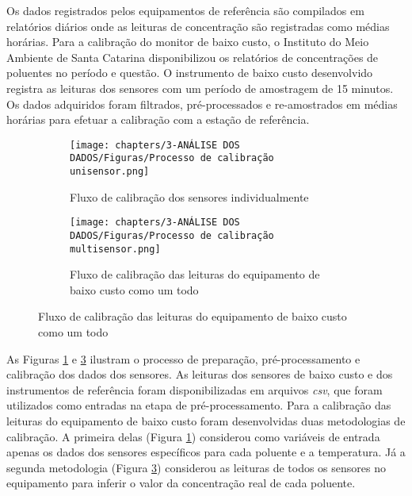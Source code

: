 Os dados registrados pelos equipamentos de referência são compilados em relatórios diários onde as leituras de concentração são registradas como médias horárias. Para a calibração do monitor de baixo custo, o Instituto do Meio Ambiente de Santa Catarina disponibilizou os relatórios de concentrações de poluentes no período e questão. O instrumento de baixo custo desenvolvido registra as leituras dos sensores com um período de amostragem de 15 minutos. Os dados adquiridos foram filtrados, pré-processados e re-amostrados em médias horárias para efetuar a calibração com a estação de referência.

\begin{figure}[h]
    \centering
    \caption{Fluxos de calibração dos sensores de baixo custo}
    \begin{subfigure}{0.9\textwidth}
        \texttt{[image: chapters/3-ANÁLISE DOS DADOS/Figuras/Processo de calibração unisensor.png]}
        \caption{Fluxo de calibração dos sensores individualmente}
        \label{fig:calibration-unisensor}
    \end{subfigure}
    \begin{subfigure}{0.9\textwidth}
        \texttt{[image: chapters/3-ANÁLISE DOS DADOS/Figuras/Processo de calibração multisensor.png]}
        \caption{Fluxo de calibração das leituras do equipamento de baixo custo como um todo}
        \label{fig:calibration-multisensor}
    \end{subfigure}
\end{figure}

As Figuras \ref{fig:calibration-unisensor} e \ref{fig:calibration-multisensor} ilustram o processo de preparação, pré-processamento e calibração dos dados dos sensores. As leituras dos sensores de baixo custo e dos instrumentos de referência foram disponibilizadas em arquivos \textit{csv}, que foram utilizados como entradas na etapa de pré-processamento. Para a calibração das leituras do equipamento de baixo custo foram desenvolvidas duas metodologias de calibração. A primeira delas (Figura \ref{fig:calibration-unisensor}) considerou como variáveis de entrada apenas os dados dos sensores específicos para cada poluente e a temperatura. Já a segunda metodologia (Figura \ref{fig:calibration-multisensor}) considerou as leituras de todos os sensores no equipamento para inferir o valor da concentração real de cada poluente.

